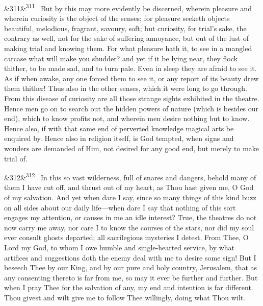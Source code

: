 \documentclass[12pt]{article}
\newcommand{\para}[1][]{\par\noindent\ifx&#1&\else\textsuperscript{\footnotesize #1}~\fi}
\begin{document}
\para[311] But by this may more evidently be discerned, wherein pleasure and wherein curiosity is the object of the senses; for pleasure seeketh objects beautiful, melodious, fragrant, savoury, soft; but curiosity, for trial's sake, the contrary as well, not for the sake of suffering annoyance, but out of the lust of making trial and knowing them. For what pleasure hath it, to see in a mangled carcase what will make you shudder? and yet if it be lying near, they flock thither, to be made sad, and to turn pale. Even in sleep they are afraid to see it. As if when awake, any one forced them to see it, or any report of its beauty drew them thither! Thus also in the other senses, which it were long to go through. From this disease of curiosity are all those strange sights exhibited in the theatre. Hence men go on to search out the hidden powers of nature (which is besides our end), which to know profits not, and wherein men desire nothing but to know. Hence also, if with that same end of perverted knowledge magical arts be enquired by. Hence also in religion itself, is God tempted, when signs and wonders are demanded of Him, not desired for any good end, but merely to make trial of.

\para[312] In this so vast wilderness, full of snares and dangers, behold many of them I have cut off, and thrust out of my heart, as Thou hast given me, O God of my salvation. And yet when dare I say, since so many things of this kind buzz on all sides about our daily life---when dare I say that nothing of this sort engages my attention, or causes in me an idle interest? True, the theatres do not now carry me away, nor care I to know the courses of the stars, nor did my soul ever consult ghosts departed; all sacrilegious mysteries I detest. From Thee, O Lord my God, to whom I owe humble and single-hearted service, by what artifices and suggestions doth the enemy deal with me to desire some sign! But I beseech Thee by our King, and by our pure and holy country, Jerusalem, that as any consenting thereto is far from me, so may it ever be further and further. But when I pray Thee for the salvation of any, my end and intention is far different. Thou givest and wilt give me to follow Thee willingly, doing what Thou wilt.
\end{document}
